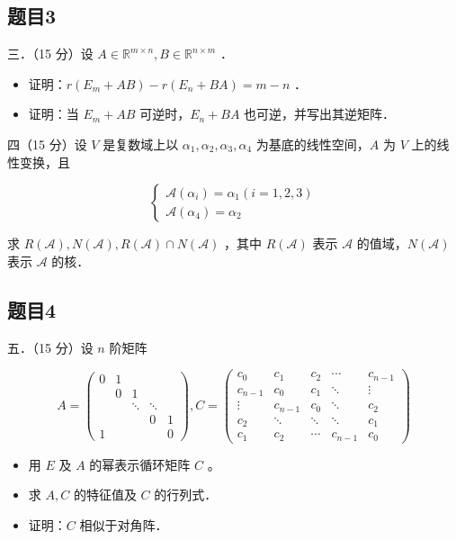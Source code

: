\documentclass{article}
\begin{document}
\subsection{题目3}
三．（15 分）设 \(A \in \mathbb{R}^{m \times n}, B \in \mathbb{R}^{n \times m}\) ．

\begin{itemize}
  \item[（1）] 证明：\(r\left(E_{m}+A B\right)-r\left(E_{n}+B A\right)=m-n\) ．
  \item[（2）] 证明：当 \(E_{m}+A B\) 可逆时，\(E_{n}+B A\) 也可逆，并写出其逆矩阵．
\end{itemize}

四（15 分）设 \(V\) 是复数域上以 \(\alpha_{1}, \alpha_{2}, \alpha_{3}, \alpha_{4}\) 为基底的线性空间，\(A\) 为 \(V\) 上的线性变换，且

\[
\left\{\begin{array}{l}
\mathcal{A}\left(\alpha_{i}\right)=\alpha_{1}(i=1,2,3) \\
\mathcal{A}\left(\alpha_{4}\right)=\alpha_{2}
\end{array}\right.
\]

求 \(R(\mathcal{A}), N(\mathcal{A}), R(\mathcal{A}) \cap N(\mathcal{A})\) ，其中 \(R(\mathcal{A})\) 表示 \(\mathcal{A}\) 的值域，\(N(\mathcal{A})\) 表示 \(\mathcal{A}\) 的核．

\subsection{题目4}
五．（15 分）设 \(n\) 阶矩阵

\[
A=\left(\begin{array}{ccccc}
0 & 1 & & & \\
& 0 & 1 & & \\
& & \ddots & \ddots & \\
& & & 0 & 1 \\
1 & & & & 0
\end{array}\right), C=\left(\begin{array}{ccccc}
c_{0} & c_{1} & c_{2} & \cdots & c_{n-1} \\
c_{n-1} & c_{0} & c_{1} & \ddots & \vdots \\
\vdots & c_{n-1} & c_{0} & \ddots & c_{2} \\
c_{2} & \ddots & \ddots & \ddots & c_{1} \\
c_{1} & c_{2} & \cdots & c_{n-1} & c_{0}
\end{array}\right)
\]

\begin{itemize}
  \item[（1）] 用 \(E\) 及 \(A\) 的幂表示循环矩阵 \(C\) 。
  \item[（2）] 求 \(A, C\) 的特征值及 \(C\) 的行列式．
  \item[（3）] 证明：\(C\) 相似于对角阵．
\end{itemize}
\end{document}
